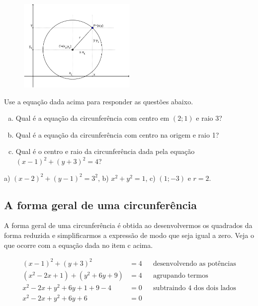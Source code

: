 \documentclass[main.tex]{subfiles}
\begin{document}
\begin{figure}[h]
\centering
\includegraphics[width=0.5\textwidth]{./img/c6q12.png}
\end{figure}

\begin{questao}
Use a equação dada acima para responder as questões abaixo.
\begin{enumerate}[a)]
\item Qual é a equação da circunferência com centro em $(2;1)$ e raio 3? 
\item Qual é a equação da circunferência com centro na origem e raio 1?
\item Qual é o centro e raio da circunferência dada pela equação $(x-1)^2+(y+3)^2=4$?
\end{enumerate} 
\end{questao}


\begin{gabarito}
	\begin{gabaritoQuestao}
		a) $(x-2)^2+(y-1)^2=3^2$, b) $x^2+y^2=1$, c) $(1;-3)$ e $r=2$.
	\end{gabaritoQuestao}
\end{gabarito}

\subsection*{A forma geral de uma circunferência}

A forma geral de uma circunferência é obtida ao desenvolvermos os quadrados da forma reduzida e simplificarmos a expressão de modo que seja igual a zero. Veja o que ocorre com a equação dada no item c acima.

\begin{align*}
 (x-1)^2+(y+3)^2 &=4 && \text{desenvolvendo as potências}\\
 (x^2-2x+1)+(y^2+6y+9)&=4 && \text{agrupando termos}\\
 x^2-2x+y^2+6y+1+9-4 &=0 && \text{subtraindo 4 dos dois lados}\\
 x^2-2x+y^2+6y+6&=0
 \end{align*}
\end{document}
